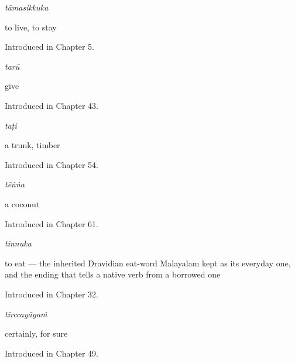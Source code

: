 \noindent\begin{minipage}[t]{\linewidth}
\raggedright
\textbf{}\enspace\emph{tāmasikkuka}\par
\small to live, to stay\par
\footnotesize Introduced in Chapter 5.
\end{minipage}\par\medskip

\noindent\begin{minipage}[t]{\linewidth}
\raggedright
\textbf{}\enspace\emph{tarū}\par
\small give\par
\footnotesize Introduced in Chapter 43.
\end{minipage}\par\medskip

\noindent\begin{minipage}[t]{\linewidth}
\raggedright
\textbf{}\enspace\emph{taṭi}\par
\small a trunk, timber\par
\footnotesize Introduced in Chapter 54.
\end{minipage}\par\medskip

\noindent\begin{minipage}[t]{\linewidth}
\raggedright
\textbf{}\enspace\emph{tēṅṅa}\par
\small a coconut\par
\footnotesize Introduced in Chapter 61.
\end{minipage}\par\medskip

\noindent\begin{minipage}[t]{\linewidth}
\raggedright
\textbf{}\enspace\emph{tinnuka}\par
\small to eat — the inherited Dravidian eat-word Malayalam kept as its everyday one, and the ending that tells a native verb from a borrowed one\par
\footnotesize Introduced in Chapter 32.
\end{minipage}\par\medskip

\noindent\begin{minipage}[t]{\linewidth}
\raggedright
\textbf{}\enspace\emph{tīrccayāyuṁ}\par
\small certainly, for sure\par
\footnotesize Introduced in Chapter 49.
\end{minipage}\par\medskip

